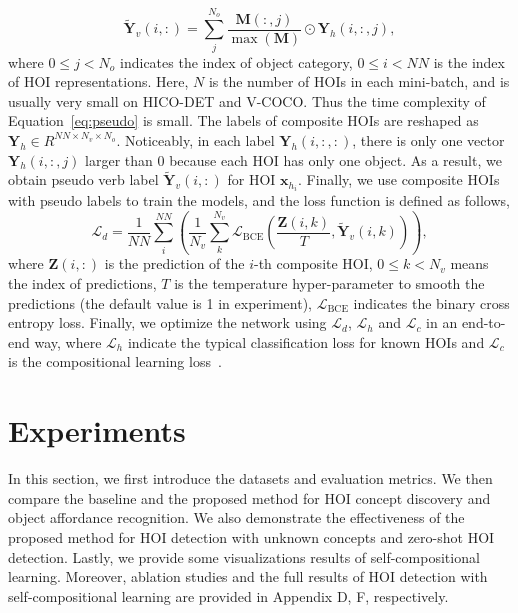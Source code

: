 \documentclass[runningheads]{llncs}
\begin{document}
\begin{equation}
\label{eq:pseudo}
    \mathbf{\tilde{Y}}_v(i,:) = \sum_j^{N_o} \frac{\mathbf{M}(:,j)}{\max(\mathbf{M})} \odot \mathbf{Y}_h(i,:,j),
\end{equation}
where $0 \leq j < N_o$ indicates the index of object category, $0 \leq i < NN$ is the index of HOI representations. Here, $N$ is the number of HOIs in each mini-batch, and is usually very small on HICO-DET and V-COCO. Thus the time complexity of Equation~\ref{eq:pseudo} is small. The labels of composite HOIs are reshaped as $\mathbf{Y}_h \in R^{NN \times N_v \times N_o}$. Noticeably, in each label $\mathbf{Y}_{h}(i, :, :)$, there is only one vector $\mathbf{Y}_{h}(i,:,j)$ larger than 0 because each HOI has only one object. As a result, we obtain pseudo verb label $\mathbf{\tilde{Y}}_{v}(i,:)$ for HOI $\mathbf{x}_{h_i}$. Finally, we use composite HOIs with pseudo labels to train the models, and the loss function is defined as follows,
\begin{equation}
    \mathcal{L}_d = \frac{1}{NN} \sum_i^{NN} (\frac{1}{N_v} \sum_{k}^{N_v} \mathcal{L}_{\text{BCE}} (\frac{\mathbf{Z}(i,k)}{T}, \mathbf{\tilde{Y}}_{v}(i,k))),
\end{equation}
where $\mathbf{Z}(i,:)$ is the prediction of the $i$-th composite HOI, $0 \leq k<N_v$ means the index of predictions, $T$ is the temperature hyper-parameter to smooth the predictions (the default value is 1 in experiment), $\mathcal{L}_{\text{BCE}}$ indicates the binary cross entropy loss. Finally, we optimize the network using
$\mathcal{L}_d$, $\mathcal{L}_{h}$ and $\mathcal{L}_{c}$ in an end-to-end way, where $\mathcal{L}_{h}$ indicate the typical classification loss for known HOIs and $\mathcal{L}_{c}$ is the compositional learning loss~\cite{hou2020visual}.


\section{Experiments}
\label{sec:exp}

In this section, we first introduce the datasets and evaluation metrics. We then compare the baseline and the proposed method for HOI concept discovery and object affordance recognition. We also demonstrate the effectiveness of the proposed method for HOI detection with unknown concepts and zero-shot HOI detection. Lastly, we provide some visualizations results of self-compositional learning. Moreover, ablation studies and the full results of HOI detection with self-compositional learning are provided in Appendix D, F, respectively.
\end{document}
